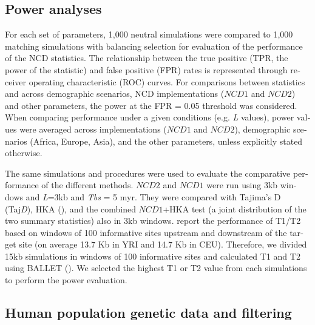 \begin{refsection}
\begin{otherlanguage}{english}
\subsection{Power analyses} %
%
For each set of parameters, 1,000 neutral simulations were compared to 1,000 matching simulations with balancing selection for evaluation of the performance of the NCD statistics. The relationship between the true positive (TPR, the power of the statistic) and false positive (FPR) rates is represented through receiver operating characteristic (ROC) curves. For comparisons between statistics and across demographic scenarios, NCD implementations ($NCD1$ and $NCD2$) and other parameters, the power at the FPR = 0.05 threshold was considered. When comparing performance under a given conditions (e.g. \emph{L} values), power values were averaged across implementations ($NCD1$ and $NCD2$), demographic scenarios (Africa, Europe, Asia), and the other parameters, unless explicitly stated otherwise.

The same simulations and procedures were used to evaluate the comparative performance of the different methods. $NCD2$ and $NCD1$ were run using 3kb windows and \emph{L}=3kb and \emph{Tbs} = 5 myr. They were compared with Tajima’s D (Taj\emph{D}), HKA (\cite{tajima1989statistical,Hudson1987}), and the combined $NCD1$+HKA test (a joint distribution of the two summary statistics) also in 3kb windows. \textcite{DeGiorgio2014} report the performance of T1/T2 based on windows of 100 informative sites upstream and downstream of the target site (on average 13.7 Kb in YRI and 14.7 Kb in CEU). Therefore, we divided 15kb simulations in windows of 100 informative sites and calculated T1 and T2 using BALLET (\cite{DeGiorgio2014}). We selected the highest T1 or T2 value from each simulations to perform the power evaluation.

\subsection{Human population genetic data and filtering} %

\end{otherlanguage}
\end{refsection}
